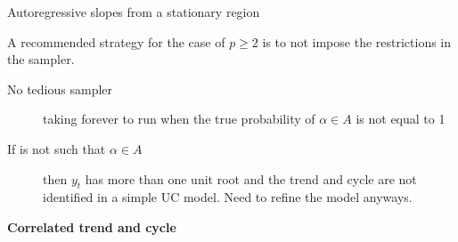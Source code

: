 \documentclass[notes,blackandwhite,mathsans,usenames,dvipsnames]{beamer}
\begin{document}
\begin{frame}{Autoregressive slopes from a stationary region}

{\color{mcxs2}A recommended strategy for the case of} $p\geq2$ {\color{mcxs2}is to not impose the restrictions in the sampler.}


\begin{description}
\item[No tedious sampler] {\color{mcxs2}taking forever to run when the true probability of} $\alpha\in A$ {\color{mcxs2}is not equal to} 1

\smallskip\item[If is not such that $\alpha\in A$] {\color{mcxs2}then} $y_t$ {\color{mcxs2}has more than one unit root and the trend and cycle are not identified in a simple UC model. Need to refine the model anyways.}
\end{description}

\end{frame}













{
\begin{frame}

\begin{adjustwidth}{-0.5cm}{0cm}
\vspace{8.3cm}
\Large\textbf{{\color{mcxs2}Correlated } {\color{mcxs1}trend and cycle}}
\end{adjustwidth}

\end{frame}
}
\end{document}
